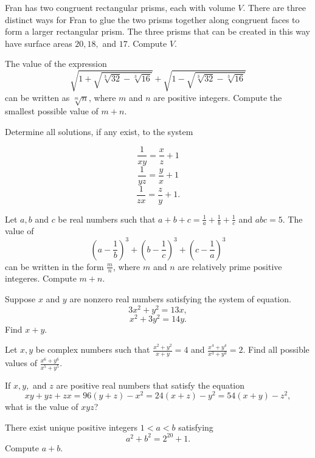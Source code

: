 \documentclass[mast]{lucky}
\begin{document}
\begin{prob}{5}
Fran has two congruent rectangular prisms, each with volume $V$. There are three distinct ways for Fran to glue the two prisms together along congruent faces to form a larger rectangular prism. The three prisms that can be created in this way have surface areas $20,18,$ and $17$. Compute $V$.
\end{prob}

\begin{prob}[NEMO 2017]{5}
The value of the expression
\[\sqrt{1+\sqrt{\sqrt[3]{32}-\sqrt[3]{16}}} + \sqrt{1-\sqrt{\sqrt[3]{32}-\sqrt[3]{16}}}\]
can be written as $\sqrt[m]{n}$, where $m$ and $n$ are positive integers. Compute the smallest possible value of
$m + n$.
\end{prob}

\begin{prob}[vvluo]{6}
Determine all solutions, if any exist, to the system


\[\frac{1}{xy}=\frac{x}{z}+1\]
\[\frac{1}{yz}=\frac{y}{x}+1 \]
\[\frac{1}{zx}=\frac{z}{y}+1.\]
\end{prob}


\begin{prob}[BMT 2020]{6}
Let $a,b$ and $c$ be real numbers such that $a+b+c=\frac{1}{a}+\frac{1}{b}+\frac{1}{c}$ and $abc=5$. The value of
\[(a-\frac{1}{b})^3+(b-\frac{1}{c})^3+(c-\frac{1}{a})^3\]
can be written in the form $\frac{m}{n}$, where $m$ and $n$ are relatively prime positive integeres. Compute $m+n$.
\end{prob}

\begin{prob}{6}
Suppose $x$ and $y$ are nonzero real numbers satisfying the system of equation.
   \[3x^2 + y^2 = 13x,\]
   \[ x^2 + 3y^2 = 14y.\]
Find $x+y$.
\end{prob}


\begin{prob}{9}
Let $x,y$ be complex numbers such that $\frac{x^2+y^2}{x+y} = 4$ and $\frac{x^4+y^4}{x^3+y^3} = 2$. Find all possible values of 
$\frac{x^6+y^6}{x^5+y^5}$.
\end{prob}

\begin{req}[JMC 10 2021/18]{9}
If $x,y,$ and $z$ are positive real numbers that satisfy the equation
\[xy+yz+zx=96(y+z)-x^2 = 24(x+z) -y^2 = 54(x+y) -z^2,\]
what is the value of $xyz$?
\end{req}

\begin{prob}[CARML 2019/8]{13}
There exist unique positive integers $1<a<b$ satisfying
\[a^2+b^2=2^{20}+1.\]
Compute $a+b$.
\end{prob}
\end{document}
